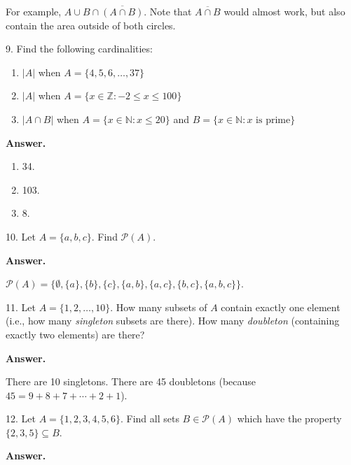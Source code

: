 \documentclass[10pt,]{book}
\theoremstyle{plain}
\theoremstyle{definition}
\theoremstyle{definition}
\theoremstyle{definition}
\numberwithin{equation}{section}
\def\N{\mathbb N}
\def\Z{\mathbb Z}
\def\pow{\mathcal P}
\def\st{:}
\def\bar{\overline}
\begin{document}
\begin{exerciselist}
            For example, \(A \cup B \cap \bar{(A \cap B)}\). Note that \(\bar{A \cap B}\) would almost work, but also contain the area outside of both circles.
\item[9.]\hypertarget{exercise-9}{}
            Find the following cardinalities:
\leavevmode%
\begin{enumerate}[label=(\alph*)]
\item\hypertarget{li-160}{}\(|A|\) when \(A = \{4,5,6,\ldots,37\}\)\item\hypertarget{li-161}{}\(|A|\) when \(A = \{x \in \Z \st -2 \le x \le 100\}\)\item\hypertarget{li-162}{}\(|A \cap B|\) when \(A = \{x \in \N \st x \le 20\}\) and \(B = \{x \in \N \st x \mbox{ is prime} \}\)\end{enumerate}
\par\smallskip
\par\smallskip
\noindent\textbf{Answer.}\hypertarget{answer-9}{}\quad
\leavevmode%
\begin{enumerate}[label=(\alph*)]
\item\hypertarget{li-163}{}
                34.
\item\hypertarget{li-164}{}
                103.
\item\hypertarget{li-165}{}
                8.
\end{enumerate}
\item[10.]\hypertarget{exercise-10}{}
            Let \(A = \{a, b, c\}\). Find \(\pow(A)\).
\par\smallskip
\par\smallskip
\noindent\textbf{Answer.}\hypertarget{answer-10}{}\quad

            \(\pow(A) = \{\emptyset, \{a\}, \{b\}, \{c\}, \{a,b\}, \{a,c\}, \{b,c\}, \{a,b,c\}\}\).
\item[11.]\hypertarget{exercise-11}{}
            Let \(A = \{1,2,\ldots, 10\}\). How many subsets of \(A\) contain exactly one element (i.e., how many \emph{singleton} subsets are there). How many \emph{doubleton} (containing exactly two elements) are there?
\par\smallskip
\par\smallskip
\noindent\textbf{Answer.}\hypertarget{answer-11}{}\quad

            There are 10 singletons. There are 45 doubletons (because \(45 = 9+8+7+\cdots+2+1\)).
\item[12.]\hypertarget{exercise-12}{}
            Let \(A = \{1,2,3,4,5,6\}\). Find all sets \(B \in \pow(A)\) which have the property \(\{2,3,5\} \subseteq B\).
\par\smallskip
\par\smallskip
\noindent\textbf{Answer.}\hypertarget{answer-12}{}\quad


\end{exerciselist}
\end{document}
